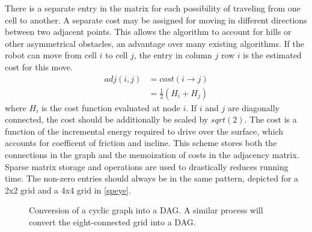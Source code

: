 \documentclass[journal]{IEEEtran}
\newcounter{row}
\newcounter{col}
\begin{document}
There is a separate entry in the matrix for each possibility of traveling from one cell to another.
A separate cost may be assigned for moving in different directions between  two adjacent points. 
This allows the algorithm to account for hills or other asymmetrical obstacles, an advantage over many existing algorithms.
If the robot can move from cell $i$ to cell $j$, the entry in column $j$ row $i$ is the estimated cost for this move. 
\begin{align}
adj(i,j) &= cost(i \rightarrow j) \\
		 &= \frac{1}{2}(H_i + H_j)
\end{align}
where $H_i$ is the cost function evaluated at node $i$. If $i$ and $j$ are diagonally connected, the cost should be additionally be scaled by $sqrt(2)$.
The cost is a function of the incremental energy required to drive over the surface, which accounts for coefficent of friction and incline.
This scheme stores both the connections in the graph and the memoization of costs in the adjacency matrix. 
Sparse matrix storage and operations are used to drastically reduces running time.
The non-zero entries should always be in the same pattern, depicted for a 2x2 grid and a 4x4 grid in \ref{speye}. 

\begin{figure}[h]
\label{DAG}
\begin{center}
\end{center}
\caption{Conversion of a cyclic graph into a DAG. A similar process will convert the eight-connected grid into a DAG.}
\end{figure}
  
\end{document}
